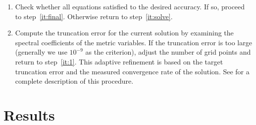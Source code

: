 \begin{enumerate}
\item
\label{it:secondlast}
 Check whether all equations satisfied to the desired
  accuracy. If so, proceed to step~\ref{it:final}. Otherwise return to step~\ref{it:solve}.

\item 
\label{it:final}
Compute the truncation error for the current solution by
  examining the spectral coefficients of the metric variables. If the
  truncation error is too large (generally we use $10^{-9}$ as the criterion), adjust the number of grid points and
  return to step~\ref{it:1}. This adaptive refinement is based on the target truncation error and the measured convergence rate of the solution. See \cite{Szilagyi:2014fna} for a complete description
of this procedure.

\end{enumerate}

\section{Results}
\label{sec:BhNSResults}




